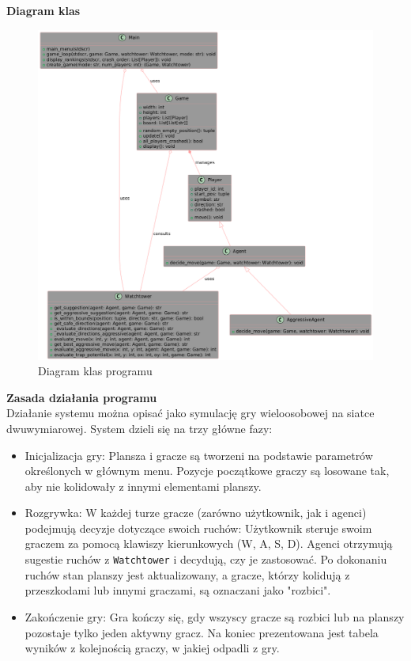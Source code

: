\documentclass[12pt,a4paper]{article}
\begin{document}
\textbf{Diagram klas}\\
\begin{figure}[H]
    \centering
    \includegraphics[width=0.8\linewidth]{media/diagram.png}
    \caption{Diagram klas programu}
    \label{fig:enter-label}
\end{figure}


\textbf{Zasada działania programu}\\
Działanie systemu można opisać jako symulację gry wieloosobowej na siatce dwuwymiarowej. System dzieli się na trzy główne fazy:

    \begin{itemize}
        \item Inicjalizacja gry:
        Plansza i gracze są tworzeni na podstawie parametrów określonych w głównym menu.
        Pozycje początkowe graczy są losowane tak, aby nie kolidowały z innymi elementami planszy.

        \item Rozgrywka:
W każdej turze gracze (zarówno użytkownik, jak i agenci) podejmują decyzje dotyczące swoich ruchów: Użytkownik steruje swoim graczem za pomocą klawiszy kierunkowych (W, A, S, D).
Agenci otrzymują sugestie ruchów z \verb|Watchtower| i decydują, czy je zastosować.
Po dokonaniu ruchów stan planszy jest aktualizowany, a gracze, którzy kolidują z przeszkodami lub innymi graczami, są oznaczani jako "rozbici".

        \item Zakończenie gry:
Gra kończy się, gdy wszyscy gracze są rozbici lub na planszy pozostaje tylko jeden aktywny gracz.
Na koniec prezentowana jest tabela wyników z kolejnością graczy, w jakiej odpadli z gry.
    \end{itemize}
\bigskip
\end{document}
